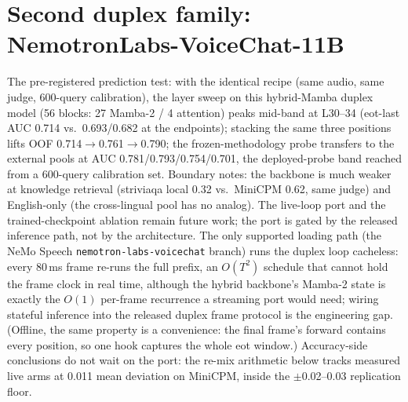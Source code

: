 \section{Second duplex family: NemotronLabs-VoiceChat-11B}
\label{app:nvda}



The pre-registered prediction test: with the identical recipe (same
audio, same judge, 600-query calibration), the layer sweep on this
hybrid-Mamba duplex model (56 blocks: 27 Mamba-2 / 4 attention) peaks
mid-band at L30--34 (eot-last AUC 0.714 vs.\ 0.693/0.682 at the
endpoints); stacking the same three positions lifts OOF
0.714$\to$0.761$\to$0.790; the frozen-methodology probe transfers to the
external pools at AUC 0.781/0.793/0.754/0.701, the deployed-probe band
reached from a 600-query calibration set. Boundary notes: the
backbone is much weaker at knowledge retrieval (striviaqa local 0.32
vs.\ MiniCPM 0.62, same judge) and English-only (the cross-lingual pool
has no analog). The live-loop port and the trained-checkpoint ablation
remain future work; the port is gated by the released inference path,
not by the architecture. The only supported loading path (the NeMo
Speech \texttt{nemotron-labs-voicechat} branch) runs the duplex loop
cacheless: every 80\,ms frame re-runs the full prefix, an
$O(T^2)$ schedule that cannot hold the frame clock in real time,
although the hybrid backbone's Mamba-2 state is exactly the $O(1)$
per-frame recurrence a streaming port would need; wiring stateful
inference into the released duplex frame protocol is the engineering
gap. (Offline, the same property is a convenience: the final frame's
forward contains every position, so one hook captures the whole
eot window.) Accuracy-side conclusions do not wait on the port: the
re-mix arithmetic below tracks measured live arms at 0.011 mean
deviation on MiniCPM, inside the $\pm$0.02--0.03 replication floor.

